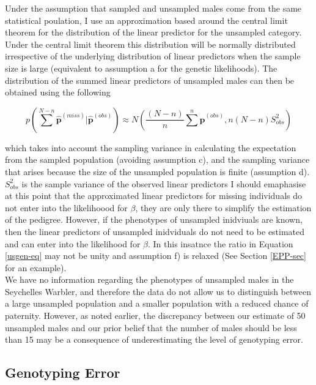 \documentclass{article}
\begin{document}
 Under the assumption that sampled and unsampled males come from the same statistical poulation, I use an approximation based around the central limit theorem for the distribution of the linear predictor for the unsampled category.  Under the central limit theorem this distribution will be normally distributed irrespective of the underlying distribution of linear predictors when the sample size is large (equivalent to assumption a for the genetic likelihoods).  The distribution of the summed linear predictors of unsampled males can then be obtained using the following

\begin{equation}
p(\sum^{N-n}{\bm{\hat{p}}^{(miss)}} | \bm{\hat{p}}^{(obs)}) \approx N(\frac{(N-n)}{n}\sum^{n}\bm{\hat{p}}^{(obs)}, n(N-n)S_{obs}^{2})
\end{equation}

which takes into account the sampling variance in calculating the expectation from the sampled population (avoiding assumption c), and the sampling variance that arises because the size of the unsampled population is finite (assumption d). $S_{obs}^{2}$ is the sample variance of the observed linear predictors \citep[see][Chapter 7]{Gelman.2004}   I should emaphasise at this point that the approximated linear predictors for missing individuals do not enter into the likelihoood for $\beta$, they are only there to simplify the estimation of the pedigree.  However, if the phenotypes of unsampled inidviuals are known, then the linear predictors of unsampled inidviduals do not need to be estimated and can enter into the likelihood for $\beta$.  In  this insatnce the ratio in Equation \ref{usgen-eq} may not be unity and assumption f) is relaxed (See Section \ref{EPP-sec} for an example).\\

We have no information regarding the phenotypes of unsampled males in the Seychelles Warbler, and therefore the data do not allow us to distinguish between a large unsampled population and a smaller population with a reduced chance of paternity.  However, as noted earlier, the discrepancy between our estimate of 50 unsampled males and our prior belief that the number of males should be less than 15 may be a consequence of underestimating the level of genotyping error.

\subsection{Genotyping Error}
\label{GE-sec}
\end{document}
